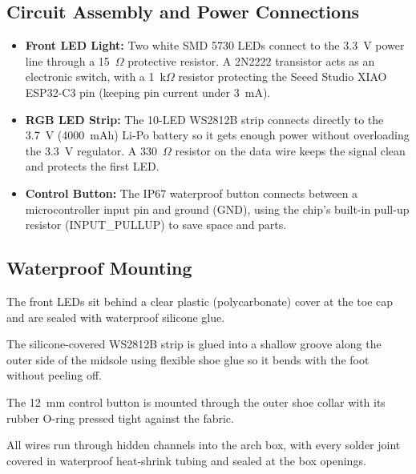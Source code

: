 \subsection{Circuit Assembly and Power Connections} %
\begin{itemize}[label=--]
    \item \textbf{Front LED Light:} Two white SMD 5730 LEDs connect to the 3.3~V power line through a 15~$\Omega$ protective resistor. A 2N2222 transistor acts as an electronic switch, with a 1~k$\Omega$ resistor protecting the Seeed Studio XIAO ESP32-C3 pin (keeping pin current under 3~mA).
    \item \textbf{RGB LED Strip:} The 10-LED WS2812B strip connects directly to the 3.7~V (4000~mAh) Li-Po battery so it gets enough power without overloading the 3.3~V regulator. A 330~$\Omega$ resistor on the data wire keeps the signal clean and protects the first LED\@.
    \item \textbf{Control Button:} The IP67 waterproof button connects between a microcontroller input pin and ground (GND), using the chip's built-in pull-up resistor (INPUT\_PULLUP) to save space and parts.
\end{itemize}

\subsection{Waterproof Mounting} %
The front LEDs sit behind a clear plastic (polycarbonate) cover at the toe cap and are sealed with waterproof silicone glue.

The silicone-covered WS2812B strip is glued into a shallow groove along the outer side of the midsole using flexible shoe glue so it bends with the foot without peeling off.

The 12~mm control button is mounted through the outer shoe collar with its rubber O-ring pressed tight against the fabric.

All wires run through hidden channels into the arch box, with every solder joint covered in waterproof heat-shrink tubing and sealed at the box openings.


